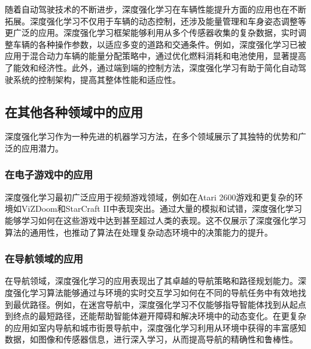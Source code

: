 随着自动驾驶技术的不断进步，深度强化学习在车辆性能提升方面的应用也在不断拓展。深度强化学习不仅用于车辆的动态控制，还涉及能量管理和车身姿态调整等更广泛的应用。深度强化学习框架能够利用从多个传感器收集的复杂数据，实时调整车辆的各种操作参数，以适应多变的道路和交通条件。例如，深度强化学习已被应用于混合动力车辆的能量分配策略中，通过优化燃料消耗和电池使用，显著提高了能效和经济性。此外，通过端到端的控制方法，深度强化学习有助于简化自动驾驶系统的控制架构，提高其整体性能和适应性。

\subsection{在其他各种领域中的应用}

深度强化学习作为一种先进的机器学习方法，在多个领域展示了其独特的优势和广泛的应用潜力。
\subsubsection{在电子游戏中的应用}

深度强化学习最初广泛应用于视频游戏领域，例如在Atari 2600游戏和更复杂的环境如ViZDoom和StarCraft II中表现突出。通过大量的模拟和试错，深度强化学习能够学习如何在这些游戏中达到甚至超过人类的表现。这不仅展示了深度强化学习算法的通用性，也推动了算法在处理复杂动态环境中的决策能力的提升。

\subsubsection{在导航领域的应用}

在导航领域，深度强化学习的应用表现出了其卓越的导航策略和路径规划能力。深度强化学习算法能够通过与环境的实时交互学习如何在不同的导航任务中有效地找到最优路径。例如，在迷宫导航中，深度强化学习不仅能够指导智能体找到从起点到终点的最短路径，还能帮助智能体避开障碍和解决环境中的动态变化。在更复杂的应用如室内导航和城市街景导航中，深度强化学习利用从环境中获得的丰富感知数据，如图像和传感器信息，进行深入学习，从而提高导航的精确性和鲁棒性。
